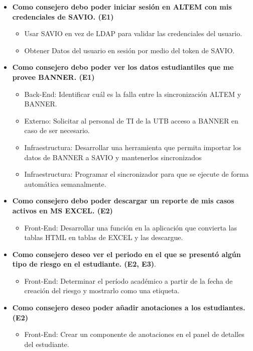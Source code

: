 \begin{itemize}
    \item \textbf{Como consejero debo poder iniciar sesión en ALTEM con mis credenciales de SAVIO. (E1)}
    \begin{itemize}
        \item Usar SAVIO en vez de LDAP para validar las credenciales del usuario.
        \item Obtener Datos del usuario en sesión por medio del token de SAVIO.
    \end{itemize}
    \item \textbf{Como consejero debo poder ver los datos estudiantiles que me provee BANNER. (E1)}
    \begin{itemize}
        \item Back-End: Identificar cuál es la falla entre la sincronización ALTEM y BANNER.
        \item Externo: Solicitar al personal de TI de la UTB acceso a BANNER en caso de ser necesario.
        \item Infraestructura: Desarrollar una herramienta que permita importar los datos de BANNER a SAVIO y mantenerlos sincronizados
        \item Infraestructura: Programar el sincronizador para que se ejecute de forma automática semanalmente.
    \end{itemize}
    \item \textbf{Como consejero debo poder descargar un reporte de mis casos activos en MS EXCEL. (E2)}
    \begin{itemize}
        \item Front-End: Desarrollar una función en la aplicación que convierta las tablas HTML en tablas de EXCEL y las descargue.
    \end{itemize}
    \item \textbf{Como consejero deseo ver el periodo en el que se presentó algún tipo de riesgo en el estudiante. (E2, E3)}.
    \begin{itemize}
        \item Front-End: Determinar el período académico a partir de la fecha de creación del riesgo y mostrarlo como una etiqueta.
    \end{itemize}
    \item \textbf{Como consejero deseo poder añadir anotaciones a los estudiantes. (E2)}
        \begin{itemize}
            \item Front-End: Crear un componente de anotaciones en el panel de detalles del estudiante.

\end{itemize}
\end{itemize}
